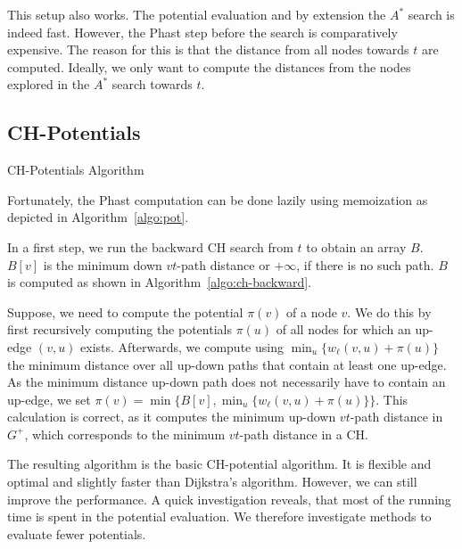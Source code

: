 \documentclass[sigconf]{acmart}
\begin{document}
This setup also works.
The potential evaluation and by extension the $A^*$ search is indeed fast.
However, the Phast step before the search is comparatively expensive.
The reason for this is that the distance from all nodes towards $t$ are computed.
Ideally, we only want to compute the distances from the nodes explored in the $A^*$ search towards $t$.

\subsection{CH-Potentials}

\begin{algorithm2e}
\caption{CH-Potentials Algorithm}
\label{algo:pot}
\end{algorithm2e}

Fortunately, the Phast computation can be done lazily using memoization as depicted in Algorithm~\ref{algo:pot}.

In a first step, we run the backward CH search from $t$ to obtain an array $B$.
$B[v]$ is the minimum down $vt$-path distance or $+\infty$, if there is no such path.
$B$ is computed as shown in Algorithm~\ref{algo:ch-backward}.

Suppose, we need to compute the potential $\pi(v)$ of a node $v$.
We do this by first recursively computing the potentials $\pi(u)$ of all nodes for which an up-edge $(v,u)$ exists.
Afterwards, we compute using $\min_u\{w_\ell(v,u) + \pi(u)\}$ the minimum distance over all up-down paths that contain at least one up-edge.
As the minimum distance up-down path does not necessarily have to contain an up-edge, we set $\pi(v) = \min \{ B[v], \min_u\{w_\ell(v,u) + \pi(u)\} \}$.
This calculation is correct, as it computes the minimum up-down $vt$-path distance in $G^+$, which corresponds to the minimum $vt$-path distance in a CH.

The resulting algorithm is the basic CH-potential algorithm.
It is flexible and optimal and slightly faster than Dijkstra's algorithm.
However, we can still improve the performance.
A quick investigation reveals, that most of the running time is spent in the potential evaluation.
We therefore investigate methods to evaluate fewer potentials.
\end{document}
